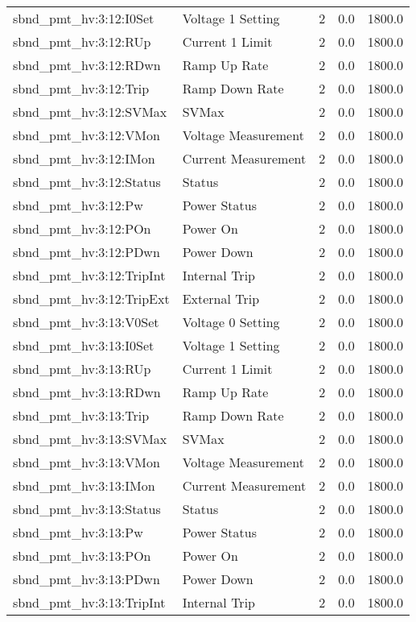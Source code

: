 \begin{center}
\begin{longtable}{l | l l l l }
sbnd\_pmt\_hv:3:12:I0Set & Voltage 1 Setting & 2 & 0.0 & 1800.0\\ 
sbnd\_pmt\_hv:3:12:RUp & Current 1 Limit & 2 & 0.0 & 1800.0\\ 
sbnd\_pmt\_hv:3:12:RDwn & Ramp Up Rate & 2 & 0.0 & 1800.0\\ 
sbnd\_pmt\_hv:3:12:Trip & Ramp Down Rate & 2 & 0.0 & 1800.0\\ 
sbnd\_pmt\_hv:3:12:SVMax & SVMax & 2 & 0.0 & 1800.0\\ 
sbnd\_pmt\_hv:3:12:VMon & Voltage Measurement & 2 & 0.0 & 1800.0\\ 
sbnd\_pmt\_hv:3:12:IMon & Current Measurement & 2 & 0.0 & 1800.0\\ 
sbnd\_pmt\_hv:3:12:Status & Status & 2 & 0.0 & 1800.0\\ 
sbnd\_pmt\_hv:3:12:Pw & Power Status & 2 & 0.0 & 1800.0\\ 
sbnd\_pmt\_hv:3:12:POn & Power On & 2 & 0.0 & 1800.0\\ 
sbnd\_pmt\_hv:3:12:PDwn & Power Down & 2 & 0.0 & 1800.0\\ 
sbnd\_pmt\_hv:3:12:TripInt & Internal Trip & 2 & 0.0 & 1800.0\\ 
sbnd\_pmt\_hv:3:12:TripExt & External Trip & 2 & 0.0 & 1800.0\\ 
sbnd\_pmt\_hv:3:13:V0Set & Voltage 0 Setting & 2 & 0.0 & 1800.0\\ 
sbnd\_pmt\_hv:3:13:I0Set & Voltage 1 Setting & 2 & 0.0 & 1800.0\\ 
sbnd\_pmt\_hv:3:13:RUp & Current 1 Limit & 2 & 0.0 & 1800.0\\ 
sbnd\_pmt\_hv:3:13:RDwn & Ramp Up Rate & 2 & 0.0 & 1800.0\\ 
sbnd\_pmt\_hv:3:13:Trip & Ramp Down Rate & 2 & 0.0 & 1800.0\\ 
sbnd\_pmt\_hv:3:13:SVMax & SVMax & 2 & 0.0 & 1800.0\\ 
sbnd\_pmt\_hv:3:13:VMon & Voltage Measurement & 2 & 0.0 & 1800.0\\ 
sbnd\_pmt\_hv:3:13:IMon & Current Measurement & 2 & 0.0 & 1800.0\\ 
sbnd\_pmt\_hv:3:13:Status & Status & 2 & 0.0 & 1800.0\\ 
sbnd\_pmt\_hv:3:13:Pw & Power Status & 2 & 0.0 & 1800.0\\ 
sbnd\_pmt\_hv:3:13:POn & Power On & 2 & 0.0 & 1800.0\\ 
sbnd\_pmt\_hv:3:13:PDwn & Power Down & 2 & 0.0 & 1800.0\\ 
sbnd\_pmt\_hv:3:13:TripInt & Internal Trip & 2 & 0.0 & 1800.0\\ 

\end{longtable}
\end{center}
